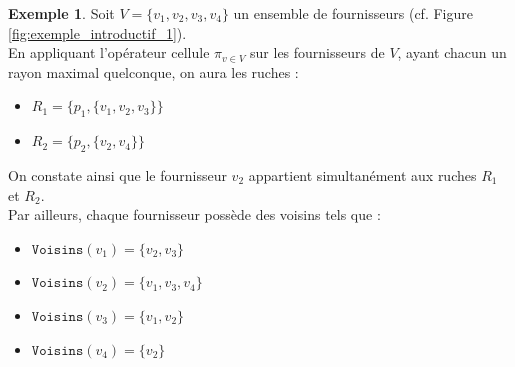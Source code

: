 \documentclass[a4paper,12pt]{report}
\theoremstyle{break}
\theoremstyle{break}
\theoremstyle{break}
\theoremstyle{break}
\theoremstyle{definition}
\newtheorem*{example}{Exemple}
\theoremstyle{remark}
\begin{document}
\begin{example}
Soit $V = \{v_1, v_2, v_3, v_4\}$ un ensemble de fournisseurs (cf. Figure \ref{fig:exemple_introductif_1}).\\
En appliquant l'opérateur cellule $\pi_{v \in V}$ sur les fournisseurs de $V$, ayant chacun un rayon maximal quelconque, on aura les ruches :
\begin{itemize}
  \item{$R_1 = \{p_1, \{v_1, v_2, v_3\}\}$}
  \item{$R_2 = \{p_2, \{v_2, v_4\}\}$}
\end{itemize}
On constate ainsi que le fournisseur $v_2$ appartient simultanément aux ruches $R_1$ et $R_2$.\\
Par ailleurs, chaque fournisseur possède des voisins tels que :
\begin{itemize}
  \item{$\texttt{Voisins}(v_1) = \{v_2, v_3\}$}
  \item{$\texttt{Voisins}(v_2) = \{v_1, v_3, v_4\}$}
  \item{$\texttt{Voisins}(v_3) = \{v_1, v_2\}$}
  \item{$\texttt{Voisins}(v_4) = \{v_2\}$}
\end{itemize}
\end{example}
\end{document}
